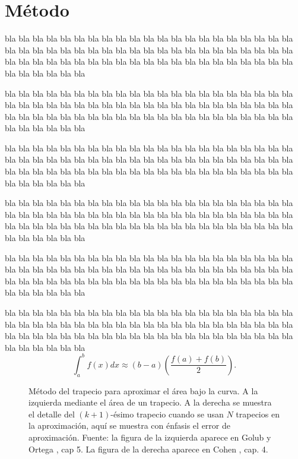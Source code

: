 \section{Método}
\label{sec:metodo}
bla bla bla bla bla bla bla bla bla bla bla bla bla bla bla bla bla bla bla
bla bla bla bla bla bla bla bla bla bla bla bla bla bla bla bla bla bla bla
bla bla bla bla bla bla bla bla bla bla bla bla bla bla bla bla bla bla bla
bla bla bla bla bla bla bla bla bla bla bla bla

bla bla bla bla bla bla bla bla bla bla bla bla bla bla bla bla bla bla bla
bla bla bla bla bla bla bla bla bla bla bla bla bla bla bla bla bla bla bla
bla bla bla bla bla bla bla bla bla bla bla bla bla bla bla bla bla bla bla
bla bla bla bla bla bla bla bla bla bla bla bla

bla bla bla bla bla bla bla bla bla bla bla bla bla bla bla bla bla bla bla
bla bla bla bla bla bla bla bla bla bla bla bla bla bla bla bla bla bla bla
bla bla bla bla bla bla bla bla bla bla bla bla bla bla bla bla bla bla bla
bla bla bla bla bla bla bla bla bla bla bla bla

bla bla bla bla bla bla bla bla bla bla bla bla bla bla bla bla bla bla bla
bla bla bla bla bla bla bla bla bla bla bla bla bla bla bla bla bla bla bla
bla bla bla bla bla bla bla bla bla bla bla bla bla bla bla bla bla bla bla
bla bla bla bla bla bla bla bla bla bla bla bla

bla bla bla bla bla bla bla bla bla bla bla bla bla bla bla bla bla bla bla
bla bla bla bla bla bla bla bla bla bla bla bla bla bla bla bla bla bla bla
bla bla bla bla bla bla bla bla bla bla bla bla bla bla bla bla bla bla bla
bla bla bla bla bla bla bla bla bla bla bla bla

bla bla bla bla bla bla bla bla bla bla bla bla bla bla bla bla bla bla bla
bla bla bla bla bla bla bla bla bla bla bla bla bla bla bla bla bla bla bla
bla bla bla bla bla bla bla bla bla bla bla bla bla bla bla bla bla bla bla
bla bla bla bla bla bla bla bla bla bla bla bla
%
\begin{displaymath}
  \int_a^b f(x) dx \approx (b-a) \left( \frac{f(a)+f(b)}{2} \right).
\end{displaymath}

\begin{figure}
  \centering
  \caption{Método del trapecio para aproximar el área bajo la curva. A la
    izquierda mediante el área de un trapecio. A la derecha se muestra el
    detalle del $(k+1)$-ésimo trapecio cuando se usan $N$ trapecios en la
    aproximación, aquí se muestra con énfasis el error de aproximación.
    Fuente: la figura de la izquierda aparece en Golub y Ortega \cite{golub},
    cap 5.  La figura de la derecha aparece en Cohen \cite{cohen}, cap. 4.}
  \label{fig:curva}
\end{figure}


